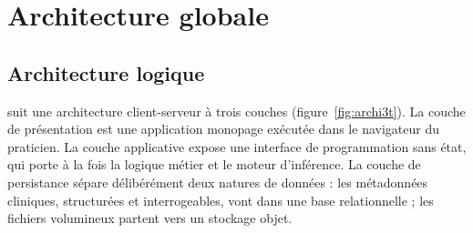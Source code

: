 \section{Architecture globale}

\subsection{Architecture logique}

\hypnoria{} suit une architecture client-serveur à trois couches
(figure~\ref{fig:archi3t}). La couche de présentation est une application monopage
exécutée dans le navigateur du praticien. La couche applicative expose une interface de
programmation sans état, qui porte à la fois la logique métier et le moteur
d'inférence. La couche de persistance sépare délibérément deux natures de données : les
métadonnées cliniques, structurées et interrogeables, vont dans une base relationnelle ;
les fichiers volumineux partent vers un stockage objet.

